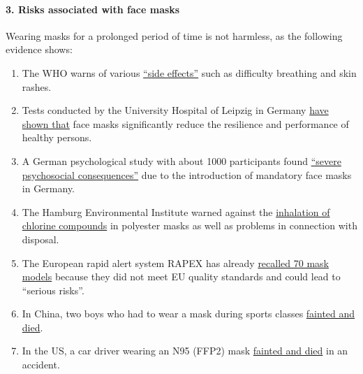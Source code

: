 \hypertarget{3-risks-associated-with-face-masks}{%
\paragraph{3. Risks associated with face
masks}\label{3-risks-associated-with-face-masks}}

Wearing masks for a prolonged period of time is not harmless, as the
following evidence shows:

\begin{enumerate}
\def\labelenumi{\arabic{enumi}.}
\tightlist
\item
  The WHO warns of various
  \href{https://www.who.int/publications/i/item/advice-on-the-use-of-masks-in-the-community-during-home-care-and-in-healthcare-settings-in-the-context-of-the-novel-coronavirus-(2019-ncov)-outbreak}{``side
  effects''} such as difficulty breathing and skin rashes.
\item
  Tests conducted by the University Hospital of Leipzig in Germany
  \href{https://science.orf.at/stories/3201213/}{have shown that} face
  masks significantly reduce the resilience and performance of healthy
  persons.
\item
  A German psychological study with about 1000 participants found
  \href{https://corona-transition.org/der-maskenzwang-ist-verantwortlich-fur-schwere-psychische-schaden-und-die}{``severe
  psychosocial consequences''} due to the introduction of mandatory face
  masks in Germany.
\item
  The Hamburg Environmental Institute warned against the
  \href{https://corona-transition.org/maskentragen-noch-ungesunder-als-gedacht}{inhalation
  of chlorine compounds} in polyester masks as well as problems in
  connection with disposal.
\item
  The European rapid alert system RAPEX has already
  \href{https://corona-transition.org/maskentragen-noch-ungesunder-als-gedacht}{recalled
  70 mask models} because they did not meet EU quality standards and
  could lead to ``serious risks''.
\item
  In China, two boys who had to wear a mask during sports classes
  \href{https://www.ibtimes.com/2-chinese-boys-wearing-masks-during-gym-class-dropped-dead-reports-say-2971556}{fainted
  and died}.
\item
  In the US, a car driver wearing an N95 (FFP2) mask
  \href{https://nypost.com/2020/04/24/driver-crashes-car-after-passing-out-from-wearing-n95-mask/}{fainted
  and died} in an accident.
\end{enumerate}


